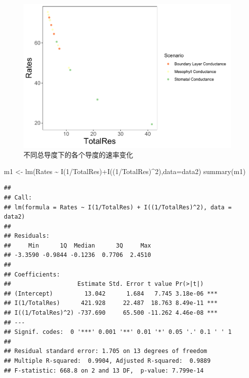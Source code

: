 \documentclass[
]{krantz}
\makeatletter
\newenvironment{Shaded}{\begin{snugshade}}{\end{snugshade}}
\newcommand{\AttributeTok}[1]{\textcolor[rgb]{0.77,0.63,0.00}{#1}}
\newcommand{\DecValTok}[1]{\textcolor[rgb]{0.00,0.00,0.81}{#1}}
\newcommand{\FunctionTok}[1]{\textcolor[rgb]{0.00,0.00,0.00}{#1}}
\newcommand{\NormalTok}[1]{#1}
\newcommand{\OtherTok}[1]{\textcolor[rgb]{0.56,0.35,0.01}{#1}}
\newcommand{\SpecialCharTok}[1]{\textcolor[rgb]{0.00,0.00,0.00}{#1}}
\newenvironment{kframe}{%
\medskip{}
\setlength{\fboxsep}{.8em}
 \def\at@end@of@kframe{}%
 \ifinner\ifhmode%
  \def\at@end@of@kframe{\end{minipage}}%
  \begin{minipage}{\columnwidth}%
 \fi\fi%
 \def\FrameCommand##1{\hskip\@totalleftmargin \hskip-\fboxsep
 \colorbox{shadecolor}{##1}\hskip-\fboxsep
     \hskip-\linewidth \hskip-\@totalleftmargin \hskip\columnwidth}%
 \MakeFramed {\advance\hsize-\width
   \@totalleftmargin\z@ \linewidth\hsize
   \@setminipage}}%
 {\par\unskip\endMakeFramed%
 \at@end@of@kframe}
\renewenvironment{Shaded}{\begin{kframe}}{\end{kframe}}
\makeatother
\begin{document}
\begin{figure}
\centering
\includegraphics{bookdown_files/figure-latex/tolresis-1.pdf}
\caption{\label{fig:tolresis}不同总导度下的各个导度的速率变化}
\end{figure}

\begin{Shaded}
\begin{Highlighting}[]
\NormalTok{m1 }\OtherTok{\textless{}{-}} \FunctionTok{lm}\NormalTok{(Rates }\SpecialCharTok{\textasciitilde{}} \FunctionTok{I}\NormalTok{(}\DecValTok{1}\SpecialCharTok{/}\NormalTok{TotalRes)}\SpecialCharTok{+}\FunctionTok{I}\NormalTok{((}\DecValTok{1}\SpecialCharTok{/}\NormalTok{TotalRes)}\SpecialCharTok{\^{}}\DecValTok{2}\NormalTok{),}\AttributeTok{data=}\NormalTok{data2)}
\FunctionTok{summary}\NormalTok{(m1)}
\end{Highlighting}
\end{Shaded}

\begin{verbatim}
## 
## Call:
## lm(formula = Rates ~ I(1/TotalRes) + I((1/TotalRes)^2), data = data2)
## 
## Residuals:
##     Min      1Q  Median      3Q     Max 
## -3.3590 -0.9844 -0.1236  0.7706  2.4510 
## 
## Coefficients:
##                   Estimate Std. Error t value Pr(>|t|)    
## (Intercept)         13.042      1.684   7.745 3.18e-06 ***
## I(1/TotalRes)      421.928     22.487  18.763 8.49e-11 ***
## I((1/TotalRes)^2) -737.690     65.500 -11.262 4.46e-08 ***
## ---
## Signif. codes:  0 '***' 0.001 '**' 0.01 '*' 0.05 '.' 0.1 ' ' 1
## 
## Residual standard error: 1.705 on 13 degrees of freedom
## Multiple R-squared:  0.9904, Adjusted R-squared:  0.9889 
## F-statistic: 668.8 on 2 and 13 DF,  p-value: 7.799e-14
\end{verbatim}
\end{document}
